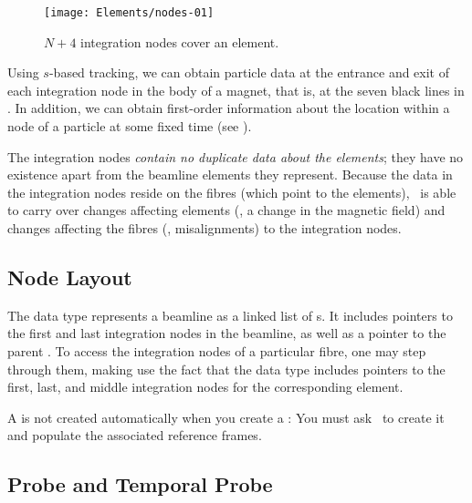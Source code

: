 \begin{figure}[ht]
  \centering
  \texttt{[image: Elements/nodes-01]}
  \caption{$N+4$ integration nodes cover an element.}
  \label{fig:integr.nodes}
\end{figure}

%
Using $s$-based tracking, we can obtain particle data at the
entrance and exit of each integration node in the body of a
magnet, that is, at the seven black lines in .
In addition, we can obtain first-order information about the location
within a node of a particle at some fixed time
(see ).

The integration nodes \emph{contain no duplicate data about
the elements}; they have no existence apart from the beamline
elements they represent. Because the data in the integration
nodes reside on the fibres (which point to the elements),
\PTC\ is able to carry over changes affecting elements
(\eg, a change in the magnetic field) and changes affecting
the fibres (\eg, misalignments) to the integration nodes.


\subsection{Node Layout}
\label{sec:node.layout}

%
%
The data type  represents a beamline as a
linked list of s. It includes pointers
to the first and last integration nodes in the beamline, as well
as a pointer to the parent . To access the
integration nodes of a particular fibre, one may step through
them, making use the fact that the data type 
includes pointers to the first, last, and middle integration nodes
for the corresponding element.

A  is not created automatically when you
create a : You must ask \PTC\ to create it and
populate the associated reference frames.


\subsection{Probe and Temporal Probe}

